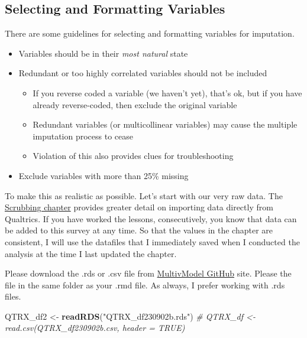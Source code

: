 \documentclass[
  11pt,
]{book}
\newenvironment{Shaded}{\begin{snugshade}}{\end{snugshade}}
\newcommand{\CommentTok}[1]{\textcolor[rgb]{0.37,0.37,0.37}{\textit{#1}}}
\newcommand{\FunctionTok}[1]{\textcolor[rgb]{0.27,0.27,0.27}{\textbf{#1}}}
\newcommand{\NormalTok}[1]{#1}
\newcommand{\OtherTok}[1]{\textcolor[rgb]{0.37,0.37,0.37}{#1}}
\newcommand{\StringTok}[1]{\textcolor[rgb]{0.5,0.5,0.5}{#1}}
\providecommand{\tightlist}{%
  \setlength{\itemsep}{0pt}\setlength{\parskip}{0pt}}
\begin{document}
\hypertarget{selecting-and-formatting-variables}{%
\subsection{Selecting and Formatting Variables}\label{selecting-and-formatting-variables}}

There are some guidelines for selecting and formatting variables for imputation.

\begin{itemize}
\tightlist
\item
  Variables should be in their \emph{most natural} state
\item
  Redundant or too highly correlated variables should not be included

  \begin{itemize}
  \tightlist
  \item
    If you reverse coded a variable (we haven't yet), that's ok, but if you have already reverse-coded, then exclude the original variable
  \item
    Redundant variables (or multicollinear variables) may cause the multiple imputation process to cease
  \item
    Violation of this also provides clues for troubleshooting
  \end{itemize}
\item
  Exclude variables with more than 25\% missing
\end{itemize}

To make this as realistic as possible. Let's start with our very raw data. The \protect\hyperlink{scrub}{Scrubbing chapter} provides greater detail on importing data directly from Qualtrics. If you have worked the lessons, consecutively, you know that data can be added to this survey at any time. So that the values in the chapter are consistent, I will use the datafiles that I immediately saved when I conducted the analysis at the time I last updated the chapter.

Please download the .rds or .csv file from \href{https://github.com/lhbikos/ReC_MultivModel}{MultivModel GitHub} site. Please the file in the same folder as your .rmd file. As always, I prefer working with .rds files.

\begin{Shaded}
\begin{Highlighting}[]
\NormalTok{QTRX\_df2 }\OtherTok{\textless{}{-}} \FunctionTok{readRDS}\NormalTok{(}\StringTok{"QTRX\_df230902b.rds"}\NormalTok{)}
\CommentTok{\# QTRX\_df \textless{}{-} read.csv(\textquotesingle{}QTRX\_df230902b.csv\textquotesingle{}, header = TRUE)}
\end{Highlighting}
\end{Shaded}
\end{document}
